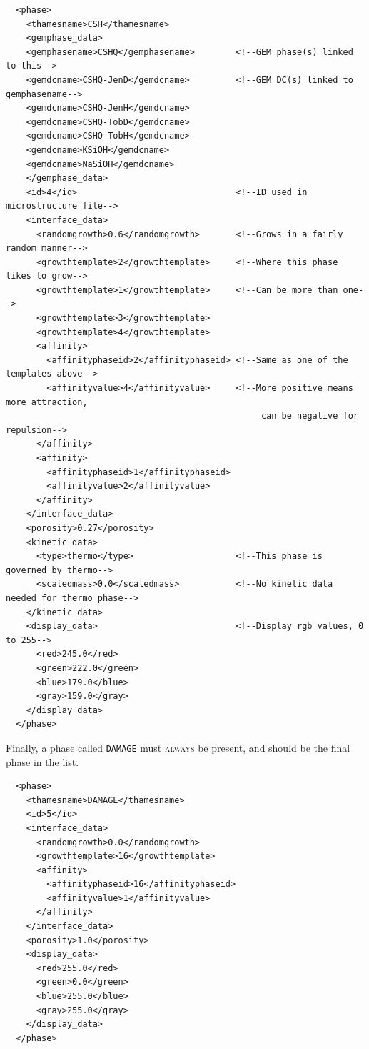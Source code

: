 \documentclass{article}
\begin{document}
\scriptsize{
    \begin{lstlisting}
  <phase>
    <thamesname>CSH</thamesname>
    <gemphase_data>
    <gemphasename>CSHQ</gemphasename>        <!--GEM phase(s) linked to this-->
    <gemdcname>CSHQ-JenD</gemdcname>         <!--GEM DC(s) linked to gemphasename-->
    <gemdcname>CSHQ-JenH</gemdcname>
    <gemdcname>CSHQ-TobD</gemdcname>
    <gemdcname>CSHQ-TobH</gemdcname>
    <gemdcname>KSiOH</gemdcname>
    <gemdcname>NaSiOH</gemdcname>
    </gemphase_data>
    <id>4</id>                               <!--ID used in microstructure file-->
    <interface_data>
      <randomgrowth>0.6</randomgrowth>       <!--Grows in a fairly random manner-->
      <growthtemplate>2</growthtemplate>     <!--Where this phase likes to grow-->
      <growthtemplate>1</growthtemplate>     <!--Can be more than one-->
      <growthtemplate>3</growthtemplate>
      <growthtemplate>4</growthtemplate>
      <affinity>
        <affinityphaseid>2</affinityphaseid> <!--Same as one of the templates above-->
        <affinityvalue>4</affinityvalue>     <!--More positive means more attraction,
                                                  can be negative for repulsion-->
      </affinity>
      <affinity>
        <affinityphaseid>1</affinityphaseid>
        <affinityvalue>2</affinityvalue>
      </affinity>
    </interface_data>
    <porosity>0.27</porosity>
    <kinetic_data>
      <type>thermo</type>                    <!--This phase is governed by thermo-->
      <scaledmass>0.0</scaledmass>           <!--No kinetic data needed for thermo phase-->
    </kinetic_data>
    <display_data>                           <!--Display rgb values, 0 to 255-->
      <red>245.0</red>
      <green>222.0</green>
      <blue>179.0</blue>
      <gray>159.0</gray>
    </display_data>
  </phase>

    \end{lstlisting}
}

\normalsize{ }
Finally, a phase called \verb!DAMAGE! must \textsc{always} be present, and
should be the final phase in the list.

\scriptsize{
    \begin{lstlisting}
  <phase>
    <thamesname>DAMAGE</thamesname>
    <id>5</id>
    <interface_data>
      <randomgrowth>0.0</randomgrowth>
      <growthtemplate>16</growthtemplate>
      <affinity>
        <affinityphaseid>16</affinityphaseid>
        <affinityvalue>1</affinityvalue>
      </affinity>
    </interface_data>
    <porosity>1.0</porosity>
    <display_data>
      <red>255.0</red>
      <green>0.0</green>
      <blue>255.0</blue>
      <gray>255.0</gray>
    </display_data>
  </phase>
    \end{lstlisting}
}
\end{document}

